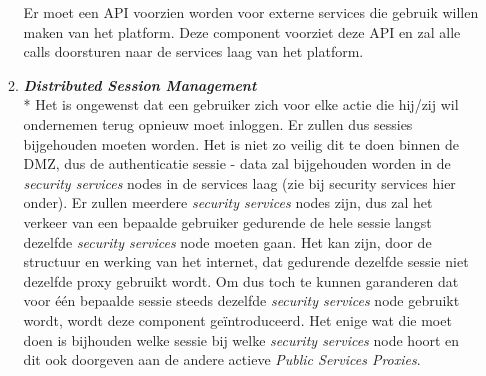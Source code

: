 \documentclass[a4paper,10pt]{article}
\begin{document}
\begin{enumerate}
\begin{enumerate}
Er moet een API voorzien worden voor externe services die gebruik willen maken van het platform. Deze component voorziet deze API en zal alle calls doorsturen naar de services laag van het platform.
\item \textit{\textbf{Distributed Session Management}}\\*
Het is ongewenst dat een gebruiker zich voor elke actie die hij/zij wil ondernemen terug opnieuw moet inloggen. Er zullen dus sessies bijgehouden moeten worden. Het is niet zo veilig dit te doen binnen de DMZ, dus de authenticatie sessie - data zal bijgehouden worden in de \textit{security services} nodes in de services laag (zie bij security services hier onder). Er zullen meerdere \textit{security services} nodes zijn, dus zal het verkeer van een bepaalde gebruiker gedurende de hele sessie langst dezelfde \textit{security services} node moeten gaan. Het kan zijn, door de structuur en werking van het internet, dat gedurende dezelfde sessie niet dezelfde proxy gebruikt wordt. Om dus toch te kunnen garanderen dat voor één bepaalde sessie steeds dezelfde \textit{security services} node gebruikt wordt, wordt deze component geïntroduceerd. Het enige wat die moet doen is bijhouden welke sessie bij welke \textit{security services} node hoort en dit ook doorgeven aan de andere actieve \textit{Public Services Proxies}.
\end{enumerate}


\end{enumerate}
\end{document}

